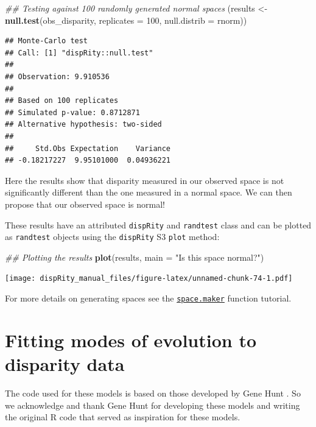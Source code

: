 \documentclass[]{book}
\newenvironment{Shaded}{\begin{snugshade}}{\end{snugshade}}
\newcommand{\CommentTok}[1]{\textcolor[rgb]{0.56,0.35,0.01}{\textit{#1}}}
\newcommand{\DataTypeTok}[1]{\textcolor[rgb]{0.13,0.29,0.53}{#1}}
\newcommand{\DecValTok}[1]{\textcolor[rgb]{0.00,0.00,0.81}{#1}}
\newcommand{\KeywordTok}[1]{\textcolor[rgb]{0.13,0.29,0.53}{\textbf{#1}}}
\newcommand{\NormalTok}[1]{#1}
\newcommand{\StringTok}[1]{\textcolor[rgb]{0.31,0.60,0.02}{#1}}
\begin{document}
\begin{Shaded}
\begin{Highlighting}[]
\CommentTok{## Testing against 100 randomly generated normal spaces}
\NormalTok{(results <-}\StringTok{ }\KeywordTok{null.test}\NormalTok{(obs_disparity, }\DataTypeTok{replicates =} \DecValTok{100}\NormalTok{,}
                      \DataTypeTok{null.distrib =}\NormalTok{ rnorm))}
\end{Highlighting}
\end{Shaded}

\begin{verbatim}
## Monte-Carlo test
## Call: [1] "dispRity::null.test"
## 
## Observation: 9.910536 
## 
## Based on 100 replicates
## Simulated p-value: 0.8712871 
## Alternative hypothesis: two-sided 
## 
##     Std.Obs Expectation    Variance 
## -0.18217227  9.95101000  0.04936221
\end{verbatim}

Here the results show that disparity measured in our observed space is not significantly different than the one measured in a normal space.
We can then propose that our observed space is normal!

These results have an attributed \texttt{dispRity} and \texttt{randtest} class and can be plotted as \texttt{randtest} objects using the \texttt{dispRity} S3 \texttt{plot} method:

\begin{Shaded}
\begin{Highlighting}[]
\CommentTok{## Plotting the results}
\KeywordTok{plot}\NormalTok{(results, }\DataTypeTok{main =} \StringTok{"Is this space normal?"}\NormalTok{)}
\end{Highlighting}
\end{Shaded}

\texttt{[image: dispRity\_manual\_files/figure-latex/unnamed-chunk-74-1.pdf]}

For more details on generating spaces see the \protect\hyperlink{Simulating-multidimensional-spaces}{\texttt{space.maker}} function tutorial.

\hypertarget{fitting-modes-of-evolution-to-disparity-data}{%
\section{Fitting modes of evolution to disparity data}\label{fitting-modes-of-evolution-to-disparity-data}}

The code used for these models is based on those developed by Gene Hunt \citep{hunt2006fitting, hunt2012measuring, hunt2015simple}.
So we acknowledge and thank Gene Hunt for developing these models and writing the original R code that served as inspiration for these models.
\end{document}
